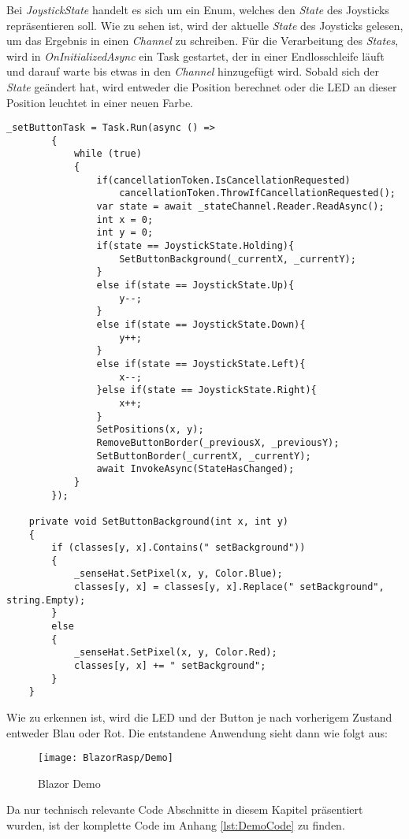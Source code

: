 Bei \emph{JoystickState} handelt es sich um ein Enum, welches den \emph{State} des Joysticks
repräsentieren soll. Wie zu sehen ist, wird der aktuelle \emph{State} des Joysticks gelesen, um
das Ergebnis in einen \emph{Channel} zu schreiben.
\newline
\newline
Für die Verarbeitung des \emph{States}, wird in \emph{OnInitializedAsync} ein Task gestartet, der
in einer Endlosschleife läuft und darauf warte bis etwas in den \emph{Channel} hinzugefügt
wird. Sobald sich der \emph{State} geändert hat, wird entweder die Position berechnet oder
die LED an dieser Position leuchtet in einer neuen Farbe.

\begin{lstlisting}[language={[Sharp]C}, caption=Task zum Verarbeiten des States,
    label=lst:StateTask]
        _setButtonTask = Task.Run(async () =>
        {
            while (true)
            {
                if(cancellationToken.IsCancellationRequested)
                    cancellationToken.ThrowIfCancellationRequested();
                var state = await _stateChannel.Reader.ReadAsync();
                int x = 0;
                int y = 0;
                if(state == JoystickState.Holding){
                    SetButtonBackground(_currentX, _currentY);
                }
                else if(state == JoystickState.Up){
                    y--;
                }
                else if(state == JoystickState.Down){
                    y++;
                }
                else if(state == JoystickState.Left){
                    x--;
                }else if(state == JoystickState.Right){
                    x++;
                }
                SetPositions(x, y);
                RemoveButtonBorder(_previousX, _previousY);
                SetButtonBorder(_currentX, _currentY);
                await InvokeAsync(StateHasChanged);
            }
        });

    private void SetButtonBackground(int x, int y)
    {
        if (classes[y, x].Contains(" setBackground"))
        {
            _senseHat.SetPixel(x, y, Color.Blue);
            classes[y, x] = classes[y, x].Replace(" setBackground", string.Empty);
        }
        else
        {
            _senseHat.SetPixel(x, y, Color.Red);
            classes[y, x] += " setBackground";
        }
    }
\end{lstlisting}

Wie zu erkennen ist, wird die LED und der Button je
nach vorherigem Zustand entweder Blau oder Rot. Die entstandene Anwendung sieht dann wie folgt aus:

\begin{figure}[h]
    \centering
    \texttt{[image: BlazorRasp/Demo]}
    \caption[Blazor Demo]{Blazor Demo}
    \label{img:BlazorDatenAnzeigen}
\end{figure}

Da nur technisch relevante Code Abschnitte in diesem Kapitel präsentiert wurden, ist der
komplette Code im Anhang \ref{lst:DemoCode} zu finden.